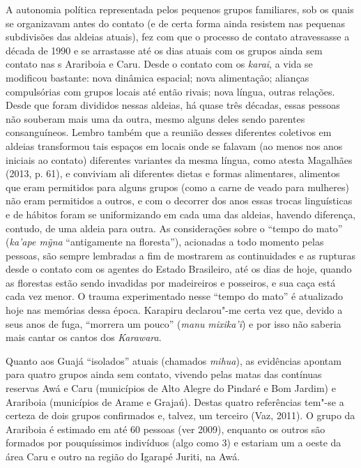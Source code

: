 A autonomia política representada pelos pequenos grupos familiares, sob
os quais se organizavam antes do contato (e de certa forma ainda
resistem nas pequenas subdivisões das aldeias atuais), fez com que o
processo de contato atravessasse a década de 1990 e se arrastasse até os
dias atuais com os grupos ainda sem contato nas s Arariboia e Caru.
Desde o contato com os \emph{karai}, a vida se modificou bastante: nova
dinâmica espacial; nova alimentação; alianças compulsórias com grupos
locais até então rivais; nova língua, outras relações. Desde que foram
divididos nessas aldeias, há quase três décadas, essas pessoas não
souberam mais uma da outra, mesmo alguns deles sendo parentes
consanguíneos. Lembro também que a reunião desses diferentes coletivos
em aldeias transformou tais espaços em locais onde se falavam (ao menos
nos anos iniciais ao contato) diferentes variantes da mesma língua, como
atesta Magalhães (2013, p. 61), e conviviam ali diferentes dietas e
formas alimentares, alimentos que eram permitidos para alguns grupos
(como a carne de veado para mulheres) não eram permitidos a outros, e
com o decorrer dos anos essas trocas linguísticas e de hábitos foram se
uniformizando em cada uma das aldeias, havendo diferença, contudo, de
uma aldeia para outra. As considerações sobre o ``tempo do mato''
(\emph{ka'ape mỹna} ``antigamente na floresta''), acionadas a todo
momento pelas pessoas, são sempre lembradas a fim de mostrarem as
continuidades e as rupturas desde o contato com os agentes do Estado
Brasileiro, até os dias de hoje, quando as florestas estão sendo
invadidas por madeireiros e posseiros, e sua caça está cada vez menor. O
trauma experimentado nesse ``tempo do mato'' é atualizado hoje nas
memórias dessa época. Karapiru declarou"-me certa vez que, devido a seus
anos de fuga, ``morrera um pouco'' (\emph{manu} \emph{mixika'ĩ}) e por
isso não saberia mais cantar os cantos dos \emph{Karawara}.

Quanto aos Guajá ``isolados'' atuais (chamados \emph{mihua}), as
evidências apontam para quatro grupos ainda sem contato, vivendo pelas
matas das contínuas reservas Awá e Caru (municípios de Alto Alegre do
Pindaré e Bom Jardim) e Arariboia (municípios de Arame e Grajaú). Destas
quatro referências tem"-se a certeza de dois grupos confirmados e,
talvez, um terceiro (Vaz, 2011). O grupo da  Arariboia é estimado em
até 60 pessoas (ver  2009), enquanto os outros são formados por
pouquíssimos indivíduos (algo como 3) e estariam um a oeste da área Caru
e outro na região do Igarapé Juriti, na  Awá.

